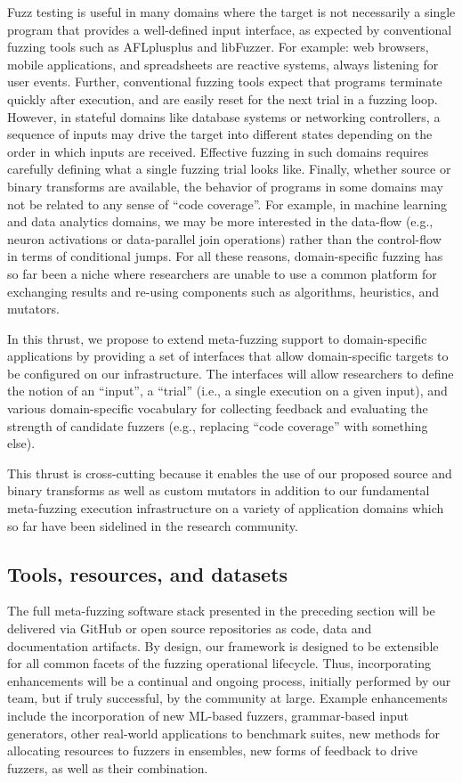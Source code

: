 Fuzz testing is useful in many domains where the target is not necessarily a single program that
provides a well-defined input interface, as expected by conventional fuzzing tools such as
AFLplusplus and libFuzzer. For example: web browsers, mobile applications, and spreadsheets 
are reactive systems, always listening for user events. Further, conventional fuzzing tools 
expect that programs terminate quickly after execution, and are easily reset 
for the next trial in a fuzzing loop. However, in stateful domains like database systems 
or networking controllers, a sequence of inputs may drive the target into different states
depending on the order in which inputs are received. Effective fuzzing in such domains requires
carefully defining what a single fuzzing trial looks like. Finally, whether source or binary 
transforms are available, the behavior of programs in some domains may not be related to
any sense of ``code coverage''. For example, in machine learning and data analytics domains,
we may be more interested in the data-flow (e.g., neuron activations or 
data-parallel join operations) rather than the control-flow in terms of 
conditional jumps. For all these reasons, domain-specific fuzzing has so far been a niche where
researchers are unable to use a common platform for exchanging results and re-using components
such as algorithms, heuristics, and mutators.

In this thrust, we propose to extend meta-fuzzing support to domain-specific applications by
providing a set of interfaces that allow domain-specific targets to be configured on our
infrastructure. The interfaces will allow researchers to define the notion of an ``input'',
a ``trial'' (i.e., a single execution on a given input), and various domain-specific vocabulary
for collecting feedback and evaluating the strength of candidate fuzzers (e.g., replacing ``code
coverage'' with something else). 

This thrust is cross-cutting because it enables the use of our proposed source and binary 
transforms as well as custom mutators in addition to our fundamental meta-fuzzing execution
infrastructure on a variety of application domains which so far have been 
sidelined in the research community.

\subsection{Tools, resources, and datasets}
The full meta-fuzzing software stack presented in the preceding section will be delivered via GitHub or open source repositories as code, 
data and documentation artifacts. By design, our framework is designed to be extensible for all common facets of the fuzzing operational lifecycle. 
Thus, incorporating enhancements
will be a continual and ongoing process, initially performed by our team, but if truly successful, by the community at large. 
Example enhancements include the incorporation of new ML-based fuzzers, grammar-based input generators, 
other real-world applications to benchmark suites, new methods for allocating resources to fuzzers in ensembles, 
new forms of feedback to drive fuzzers, as well as their combination.

